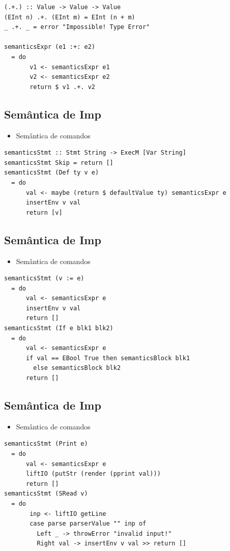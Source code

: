 \documentclass[11pt]{article}
\begin{document}
\begin{verbatim}
(.+.) :: Value -> Value -> Value
(EInt n) .+. (EInt m) = EInt (n + m)
_ .+. _ = error "Impossible! Type Error"

semanticsExpr (e1 :+: e2)
  = do
       v1 <- semanticsExpr e1
       v2 <- semanticsExpr e2
       return $ v1 .+. v2
\end{verbatim}
\subsection*{Semântica de Imp}
\label{sec:orgd2afe0f}

\begin{itemize}
\item Semântica de comandos
\end{itemize}

\begin{verbatim}
semanticsStmt :: Stmt String -> ExecM [Var String]
semanticsStmt Skip = return []
semanticsStmt (Def ty v e)
  = do
      val <- maybe (return $ defaultValue ty) semanticsExpr e
      insertEnv v val
      return [v]
\end{verbatim}
\subsection*{Semântica de Imp}
\label{sec:orgfc66bd4}

\begin{itemize}
\item Semântica de comandos
\end{itemize}

\begin{verbatim}
semanticsStmt (v := e)
  = do
      val <- semanticsExpr e
      insertEnv v val
      return []
semanticsStmt (If e blk1 blk2)
  = do
      val <- semanticsExpr e
      if val == EBool True then semanticsBlock blk1
        else semanticsBlock blk2
      return []
\end{verbatim}
\subsection*{Semântica de Imp}
\label{sec:org093ac6b}

\begin{itemize}
\item Semântica de comandos
\end{itemize}

\begin{verbatim}
semanticsStmt (Print e)
  = do
      val <- semanticsExpr e
      liftIO (putStr (render (pprint val)))
      return []
semanticsStmt (SRead v)
  = do
       inp <- liftIO getLine
       case parse parserValue "" inp of
         Left _ -> throwError "invalid input!"
         Right val -> insertEnv v val >> return []
\end{verbatim}
\end{document}

